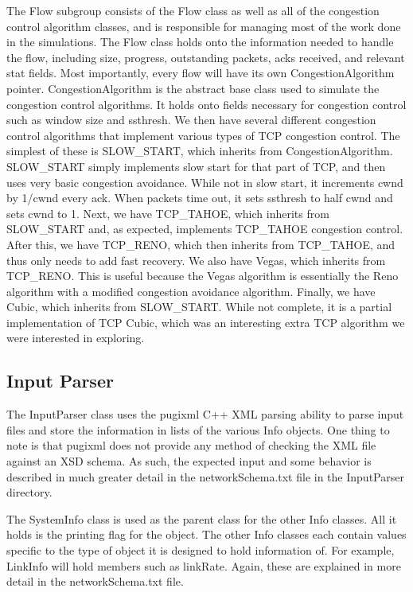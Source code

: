 \documentclass{article}
\begin{document}
    The Flow subgroup consists of the Flow class as well as all of the congestion control algorithm classes, and is responsible for managing most of the work done in the simulations. The Flow class holds onto the information needed to handle the flow, including size, progress, outstanding packets, acks received, and relevant stat fields. Most importantly, every flow will have its own CongestionAlgorithm pointer. CongestionAlgorithm is the abstract base class used to simulate the congestion control algorithms. It holds onto fields necessary for congestion control such as window size and ssthresh. We then have several different congestion control algorithms that implement various types of TCP congestion control. The simplest of these is SLOW\_START, which inherits from CongestionAlgorithm. SLOW\_START simply implements slow start for that part of TCP, and then uses very basic congestion avoidance. While not in slow start, it increments cwnd by 1/cwnd every ack. When packets time out, it sets ssthresh to half cwnd and sets cwnd to 1. Next, we have TCP\_TAHOE, which inherits from SLOW\_START and, as expected, implements TCP\_TAHOE congestion control. After this, we have TCP\_RENO, which then inherits from TCP\_TAHOE, and thus only needs to add fast recovery. We also have Vegas, which inherits from TCP\_RENO. This is useful because the Vegas algorithm is essentially the Reno algorithm with a modified congestion avoidance algorithm. Finally, we have Cubic, which inherits from SLOW\_START. While not complete, it is a partial implementation of TCP Cubic, which was an interesting extra TCP algorithm we were interested in exploring.


\subsection{Input Parser}

    The InputParser class uses the pugixml C++ XML parsing ability to parse input files and store the information in lists of the various Info objects. One thing to note is that pugixml does not provide any method of checking the XML file against an XSD schema. As such, the expected input and some behavior is described in much greater detail in the networkSchema.txt file in the InputParser directory.

    The SystemInfo class is used as the parent class for the other Info classes. All it holds is the printing flag for the object. The other Info classes each contain values specific to the type of object it is designed to hold information of. For example, LinkInfo will hold members such as linkRate. Again, these are explained in more detail in the networkSchema.txt file.
\end{document}
